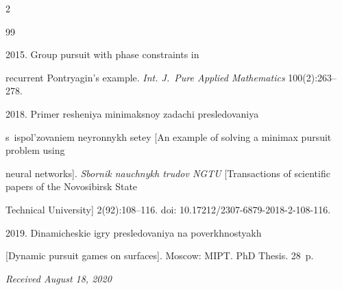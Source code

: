 \begin{multicols}{2}
{{\begin{thebibliography}{99}


 2015. Group pursuit with phase constraints in 


recurrent Pontryagin's example. \textit{Int. J.~Pure Applied Mathematics} 100(2):263--278.





\pagebreak 







 2018. Primer resheniya mi\-ni\-maks\-noy zadachi presledovaniya 


s~ispol'zovaniem ney\-ron\-nykh se\-tey [An example of solving a minimax pursuit problem using 


neural networks]. \textit{Sbornik nauchnykh trudov NGTU} [Transactions of scientific papers of the Novosibirsk State 


Technical University] 2(92):108--116. doi: 10.17212/2307-6879-2018-2-108-116.





\vspace*{-2pt}







 2019. Dinamicheskie igry presledovaniya na poverkhnostyakh 


[Dynamic pursuit games on surfaces].  Moscow: MIPT.  PhD Thesis. 28~p.


\end{thebibliography}





 }


 }





\end{multicols}





\vspace*{-6pt}





\hfill{\small\textit{Received August 18, 2020}}





